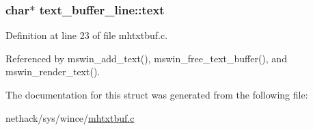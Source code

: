 \hypertarget{structtext__buffer__line_ab3af8e4e600d655d06c514cd743eca92}{
\subsubsection[{text}]{\setlength{\rightskip}{0pt plus 5cm}char$\ast$ text\+\_\+buffer\+\_\+line\+::text}}\label{structtext__buffer__line_ab3af8e4e600d655d06c514cd743eca92}


Definition at line 23 of file mhtxtbuf.\+c.



Referenced by mswin\+\_\+add\+\_\+text(), mswin\+\_\+free\+\_\+text\+\_\+buffer(), and mswin\+\_\+render\+\_\+text().



The documentation for this struct was generated from the following file\+:\begin{DoxyCompactItemize}
\item 
nethack/sys/wince/\hyperlink{mhtxtbuf_8c}{mhtxtbuf.\+c}\end{DoxyCompactItemize}
